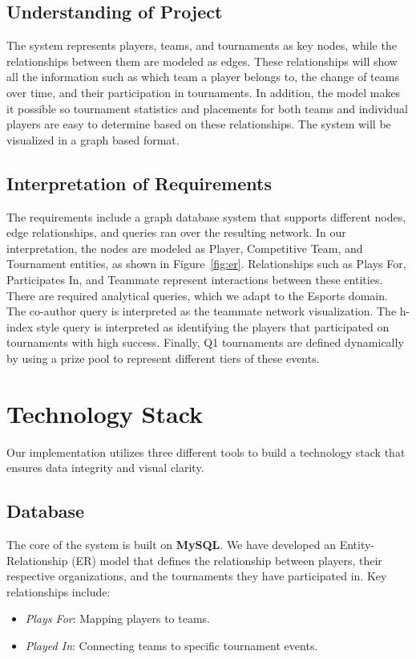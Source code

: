 \documentclass[sigconf]{acmart}
\begin{document}
\subsection{Understanding of Project}
The system represents players, teams, and tournaments as key nodes, while the relationships between them are modeled as edges. These relationships will show all the information such as which team a player belongs to, the change of teams over time, and their participation in tournaments. In addition, the model makes it possible so tournament statistics and placements for both teams and individual players are easy to determine based on these relationships. The system will be visualized in a graph based format.

\subsection{Interpretation of Requirements}
The requirements include a graph database system that supports different nodes, edge relationships, and queries ran over the resulting network. In our interpretation, the nodes are modeled as Player, Competitive Team, and Tournament entities, as shown in Figure~\ref{fig:er}. Relationships such as Plays For, Participates In, and Teammate represent interactions between these entities. There are required analytical queries, which we adapt to the Esports domain. The co-author query is interpreted as the teammate network visualization. The h-index style query is interpreted as identifying the players that participated on tournaments with high success. Finally, Q1 tournaments are defined dynamically by using a prize pool to represent different tiers of these events.

\section{Technology Stack}
Our implementation utilizes three different tools to build a technology stack that ensures data integrity and visual clarity.

\subsection{Database}
The core of the system is built on \textbf{MySQL}. We have developed an Entity-Relationship (ER) model that defines the relationship between players, their respective organizations, and the tournaments they have participated in. Key relationships include:
\begin{itemize}
    \item \textit{Plays For}: Mapping players to teams.
    \item \textit{Played In}: Connecting teams to specific tournament events.
\end{itemize}
\end{document}
